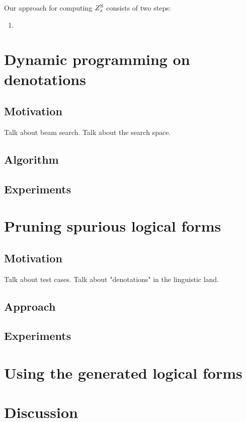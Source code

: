 Our approach for computing $Z^\mathrm{S}_x$ consists of two steps:
\begin{enumerate}
\item 
\end{enumerate}

\section{Dynamic programming on denotations}
\subsection{Motivation}
Talk about beam search.
Talk about the search space.

\subsection{Algorithm}
\subsection{Experiments}

\section{Pruning spurious logical forms}
\subsection{Motivation}
Talk about test cases.
Talk about "denotations" in the linguistic land.

\subsection{Approach}

\subsection{Experiments}

\section{Using the generated logical forms}
\section{Discussion}
